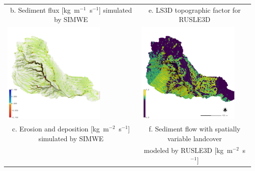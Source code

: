 \documentclass{standalone}
\begin{document}
\begin{tabular}{m{} m{}}
\multicolumn{1}{c}{b. Sediment flux [kg~m$^{-1}$~s$^{-1}$] simulated by SIMWE}&
\multicolumn{1}{c}{e. LS3D topographic factor for RUSLE3D}\\
\includegraphics[height=50mm,center]{../../images/sample_data/erosion_deposition_2016.png}&
\includegraphics[height=50mm,center]{../../images/sample_data/sediment_flow_2016_carto.png}\\
\multicolumn{1}{c}{c. Erosion and deposition [kg~m$^{-2}$~s$^{-1}$] simulated by SIMWE}&
\multicolumn{1}{c}{f. Sediment flow with spatially variable landcover}\\
& \multicolumn{1}{c}{modeled by RUSLE3D [kg~m$^{-2}$~s$^{-1}$]}\\
%
\end{tabular}
\end{document}
